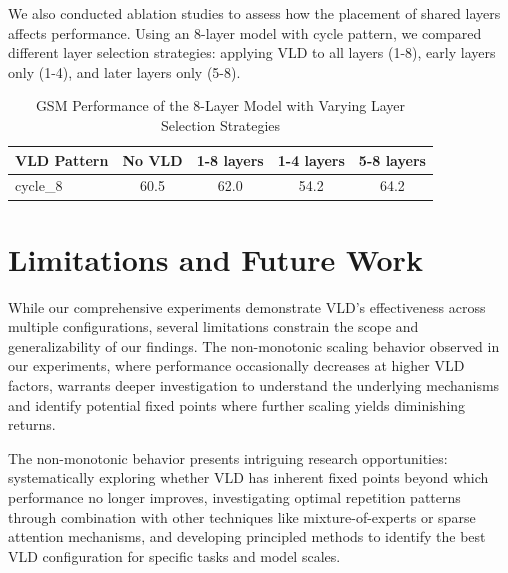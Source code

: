 \documentclass{article} %
\begin{document}
We also conducted ablation studies to assess how the placement of shared layers affects performance. Using an 8-layer model with cycle pattern, we compared different layer selection strategies: applying VLD to all layers (1-8), early layers only (1-4), and later layers only (5-8).

\begin{table}[h]
\centering
\caption{GSM Performance of the 8-Layer Model with Varying Layer Selection Strategies}
\label{tab:layer_selection}
\begin{tabular}{lcccc}
\toprule
VLD Pattern & No VLD & 1-8 layers & 1-4 layers & 5-8 layers \\
\midrule
cycle\_8 & 60.5 & 62.0 & 54.2 & 64.2 \\
\bottomrule
\end{tabular}
\end{table}




\section{Limitations and Future Work} \label{sec:limitations}
While our comprehensive experiments demonstrate VLD's effectiveness across multiple configurations, several limitations constrain the scope and generalizability of our findings. The non-monotonic scaling behavior observed in our experiments, where performance occasionally decreases at higher VLD factors, warrants deeper investigation to understand the underlying mechanisms and identify potential fixed points where further scaling yields diminishing returns.  

The non-monotonic behavior presents intriguing research opportunities: systematically exploring whether VLD has inherent fixed points beyond which performance no longer improves, investigating optimal repetition patterns through combination with other techniques like mixture-of-experts or sparse attention mechanisms, and developing principled methods to identify the best VLD configuration for specific tasks and model scales.
\end{document}

